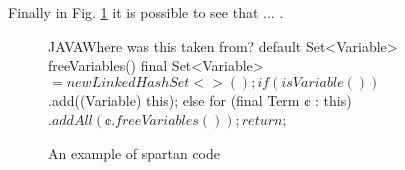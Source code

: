 Finally in Fig. \ref{figure:shock-3} it is possible to see that ... .

\begin{figure}[h]
\label{figure:shock-3}
\caption{An example of spartan code}
\begin{Code}{JAVA}{Where was this taken from?}
default Set<Variable> freeVariables() {
    final Set<Variable> $ = new LinkedHashSet<>();
    if (isVariable())
      $.add((Variable) this);
    else
      for (final Term ¢ : this)
        $.addAll(¢.freeVariables());
    return $;
  }
\end{Code}
\end{figure}


